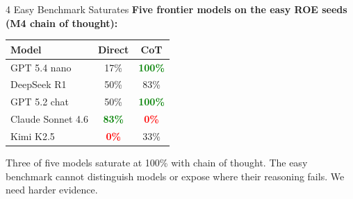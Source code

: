 \documentclass[aspectratio=169, 10pt]{beamer}
\newcommand{\hi}[1]{\textcolor{Green}{\textbf{#1}}}
\newcommand{\lo}[1]{\textcolor{Red}{\textbf{#1}}}
\begin{document}
\begin{frame}{4 \quad Easy Benchmark Saturates}
\vspace{0.3em}
\centering
\textbf{Five frontier models on the easy ROE seeds (M4 chain of thought):}

\vspace{0.6em}
\begin{tabular}{@{}lcc@{}}
  \toprule
  \textbf{Model} & \textbf{Direct} & \textbf{CoT} \\
  \midrule
  GPT 5.4 nano       &  17\%      & \hi{100\%} \\
  DeepSeek R1        &  50\%      &  83\%      \\
  GPT 5.2 chat       &  50\%      & \hi{100\%} \\
  Claude Sonnet 4.6  & \hi{83\%}  & \lo{ 0\%}  \\
  Kimi K2.5          & \lo{ 0\%}  &  33\%      \\
  \bottomrule
\end{tabular}

\vspace{0.7em}
\raggedright

Three of five models saturate at 100\% with chain of thought.
The easy benchmark cannot distinguish models or expose where
their reasoning fails. We need harder evidence.
\end{frame}
\end{document}
